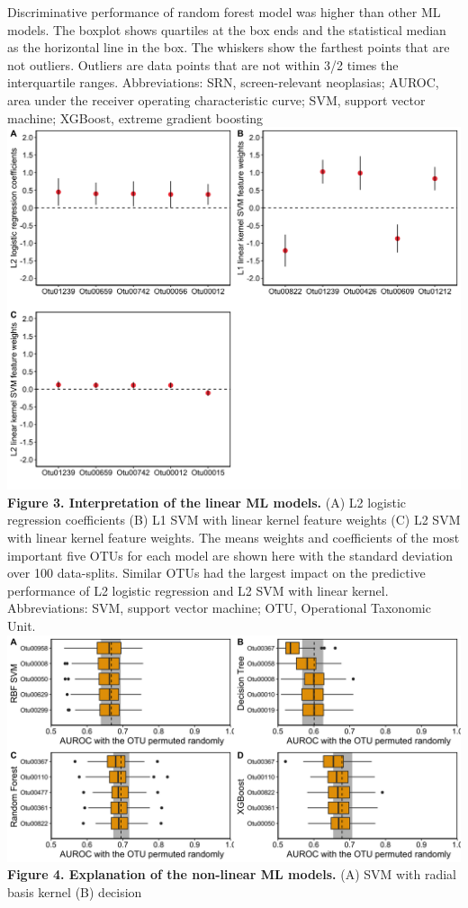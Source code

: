 \documentclass[11pt,]{article}
\begin{document}
Discriminative performance of random forest model was higher than other
ML models. The boxplot shows quartiles at the box ends and the
statistical median as the horizontal line in the box. The whiskers show
the farthest points that are not outliers. Outliers are data points that
are not within 3/2 times the interquartile ranges. Abbreviations: SRN,
screen-relevant neoplasias; AUROC, area under the receiver operating
characteristic curve; SVM, support vector machine; XGBoost, extreme
gradient boosting \newpage
\includegraphics{Figure_3.png} \textbf{Figure 3. Interpretation of the
linear ML models.} (A) L2 logistic regression coefficients (B) L1 SVM
with linear kernel feature weights (C) L2 SVM with linear kernel feature
weights. The means weights and coefficients of the most important five
OTUs for each model are shown here with the standard deviation over 100
data-splits. Similar OTUs had the largest impact on the predictive
performance of L2 logistic regression and L2 SVM with linear kernel.
Abbreviations: SVM, support vector machine; OTU, Operational Taxonomic
Unit. \newpage
\includegraphics{Figure_4.png} \textbf{Figure 4. Explanation of the
non-linear ML models.} (A) SVM with radial basis kernel (B) decision
\end{document}
